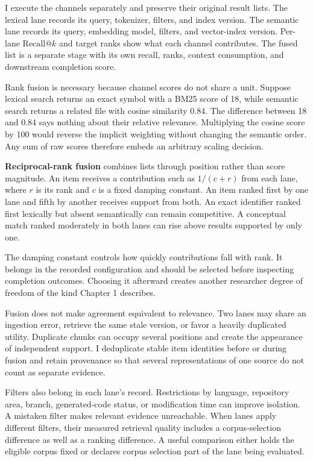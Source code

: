 I execute the channels separately and preserve their original result lists. The lexical lane records its query, tokenizer, filters, and index version. The semantic lane records its query, embedding model, filters, and vector-index version. Per-lane \(\mathrm{Recall}@k\) and target ranks show what each channel contributes. The fused list is a separate stage with its own recall, ranks, context consumption, and downstream completion score.

Rank fusion is necessary because channel scores do not share a unit. Suppose lexical search returns an exact symbol with a BM25 score of 18, while semantic search returns a related file with cosine similarity 0.84. The difference between 18 and 0.84 says nothing about their relative relevance. Multiplying the cosine score by 100 would reverse the implicit weighting without changing the semantic order. Any sum of raw scores therefore embeds an arbitrary scaling decision.

\textbf{Reciprocal-rank fusion} combines lists through position rather than score magnitude. An item receives a contribution such as \(1/(c+r)\) from each lane, where \(r\) is its rank and \(c\) is a fixed damping constant. An item ranked first by one lane and fifth by another receives support from both. An exact identifier ranked first lexically but absent semantically can remain competitive. A conceptual match ranked moderately in both lanes can rise above results supported by only one.

The damping constant controls how quickly contributions fall with rank. It belongs in the recorded configuration and should be selected before inspecting completion outcomes. Choosing it afterward creates another researcher degree of freedom of the kind Chapter 1 describes.

Fusion does not make agreement equivalent to relevance. Two lanes may share an ingestion error, retrieve the same stale version, or favor a heavily duplicated utility. Duplicate chunks can occupy several positions and create the appearance of independent support. I deduplicate stable item identities before or during fusion and retain provenance so that several representations of one source do not count as separate evidence.

Filters also belong in each lane's record. Restrictions by language, repository area, branch, generated-code status, or modification time can improve isolation. A mistaken filter makes relevant evidence unreachable. When lanes apply different filters, their measured retrieval quality includes a corpus-selection difference as well as a ranking difference. A useful comparison either holds the eligible corpus fixed or declares corpus selection part of the lane being evaluated.

